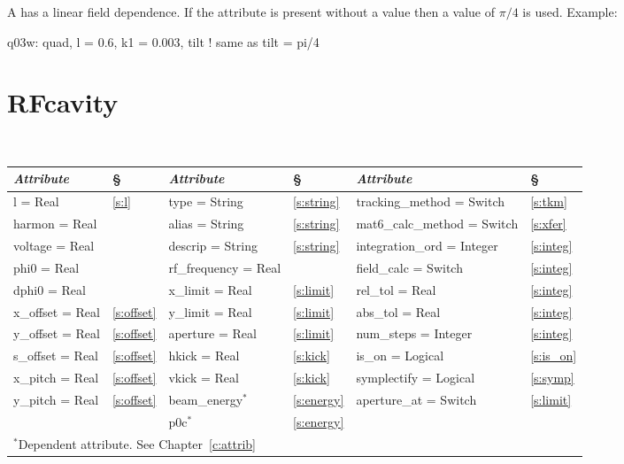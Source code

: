 {{
A  has a linear field dependence.
If the  attribute is present without a value then a value of $\pi/4$
is used.
Example:
\begin{example}
  q03w: quad, l = 0.6, k1 = 0.003, tilt  ! same as tilt = pi/4
\end{example}

\section{RFcavity}
\label{s:rfcav}

\begin{center}
\tt
\begin{tabular}{|l|l||l|l||l|l|} \hline
  {\sl Attribute} & \S  & {\sl Attribute} & \S & {\sl Attribute} & \S \\ \hline
  l        = Real     & \ref{s:l}      & type = String      & \ref{s:string} & tracking\_method = Switch   & \ref{s:tkm}   \\ \hline
  harmon   = Real     &                & alias = String     & \ref{s:string} & mat6\_calc\_method = Switch & \ref{s:xfer}  \\ \hline
  voltage  = Real     &                & descrip = String   & \ref{s:string} & integration\_ord = Integer  & \ref{s:integ} \\ \hline
  phi0     = Real     &                & rf\_frequency = Real &              & field\_calc = Switch        & \ref{s:integ} \\ \hline
  dphi0    = Real     &                & x\_limit = Real    & \ref{s:limit}  & rel\_tol = Real             & \ref{s:integ} \\ \hline
  x\_offset  = Real   & \ref{s:offset} & y\_limit = Real    & \ref{s:limit}  & abs\_tol = Real             & \ref{s:integ} \\ \hline
  y\_offset  = Real   & \ref{s:offset} & aperture = Real    & \ref{s:limit}  & num\_steps = Integer        & \ref{s:integ} \\ \hline
  s\_offset  = Real   & \ref{s:offset} & hkick    = Real    & \ref{s:kick}   & is\_on = Logical            & \ref{s:is_on} \\ \hline
  x\_pitch = Real     & \ref{s:offset} & vkick    = Real    & \ref{s:kick}   & symplectify = Logical       & \ref{s:symp}  \\ \hline
  y\_pitch = Real     & \ref{s:offset} & beam\_energy$^*$   & \ref{s:energy} & aperture\_at = Switch       & \ref{s:limit} \\ \hline
                      &                & p0c$^*$            & \ref{s:energy} &                             &               \\ \hline
  \multicolumn{6}{l}{\small $^*$Dependent attribute. See Chapter~\ref{c:attrib}} \\
\end{tabular}
\end{center}
\toffset

}}
